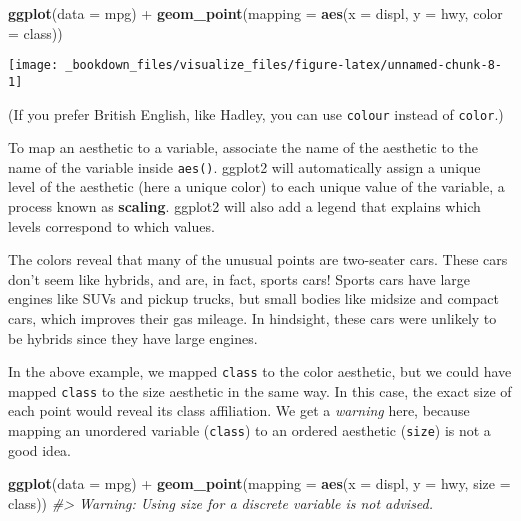 \documentclass[]{book}
\newenvironment{Shaded}{\begin{snugshade}}{\end{snugshade}}
\newcommand{\KeywordTok}[1]{\textcolor[rgb]{0.13,0.29,0.53}{\textbf{{#1}}}}
\newcommand{\DataTypeTok}[1]{\textcolor[rgb]{0.13,0.29,0.53}{{#1}}}
\newcommand{\StringTok}[1]{\textcolor[rgb]{0.31,0.60,0.02}{{#1}}}
\newcommand{\CommentTok}[1]{\textcolor[rgb]{0.56,0.35,0.01}{\textit{{#1}}}}
\newcommand{\NormalTok}[1]{{#1}}
\begin{document}
\begin{Shaded}
\begin{Highlighting}[]
\KeywordTok{ggplot}\NormalTok{(}\DataTypeTok{data =} \NormalTok{mpg) +}\StringTok{ }
\StringTok{  }\KeywordTok{geom_point}\NormalTok{(}\DataTypeTok{mapping =} \KeywordTok{aes}\NormalTok{(}\DataTypeTok{x =} \NormalTok{displ, }\DataTypeTok{y =} \NormalTok{hwy, }\DataTypeTok{color =} \NormalTok{class))}
\end{Highlighting}
\end{Shaded}

\begin{center}\texttt{[image: \_bookdown\_files/visualize\_files/figure-latex/unnamed-chunk-8-1]} \end{center}

(If you prefer British English, like Hadley, you can use \texttt{colour}
instead of \texttt{color}.)

To map an aesthetic to a variable, associate the name of the aesthetic
to the name of the variable inside \texttt{aes()}. ggplot2 will
automatically assign a unique level of the aesthetic (here a unique
color) to each unique value of the variable, a process known as
\textbf{scaling}. ggplot2 will also add a legend that explains which
levels correspond to which values.

The colors reveal that many of the unusual points are two-seater cars.
These cars don't seem like hybrids, and are, in fact, sports cars!
Sports cars have large engines like SUVs and pickup trucks, but small
bodies like midsize and compact cars, which improves their gas mileage.
In hindsight, these cars were unlikely to be hybrids since they have
large engines.

In the above example, we mapped \texttt{class} to the color aesthetic,
but we could have mapped \texttt{class} to the size aesthetic in the
same way. In this case, the exact size of each point would reveal its
class affiliation. We get a \emph{warning} here, because mapping an
unordered variable (\texttt{class}) to an ordered aesthetic
(\texttt{size}) is not a good idea.

\begin{Shaded}
\begin{Highlighting}[]
\KeywordTok{ggplot}\NormalTok{(}\DataTypeTok{data =} \NormalTok{mpg) +}\StringTok{ }
\StringTok{  }\KeywordTok{geom_point}\NormalTok{(}\DataTypeTok{mapping =} \KeywordTok{aes}\NormalTok{(}\DataTypeTok{x =} \NormalTok{displ, }\DataTypeTok{y =} \NormalTok{hwy, }\DataTypeTok{size =} \NormalTok{class))}
\CommentTok{#> Warning: Using size for a discrete variable is not advised.}
\end{Highlighting}
\end{Shaded}
\end{document}
